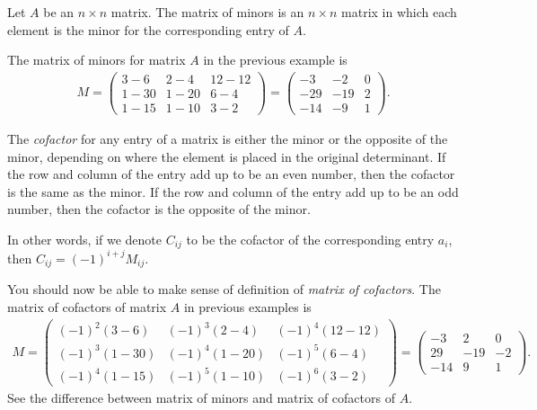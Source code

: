 \documentclass{subfile}
\begin{document}
	\begin{definition}
		Let $A$ be an $n\times n$ matrix. The matrix of minors is an $n\times n$ matrix in which each element is the minor for the corresponding entry of $A$.
	\end{definition}
	
	\begin{example}
		The matrix of minors for matrix $A$ in the previous example is
		\begin{align*}
			M= \begin{pmatrix}
			3-6&2-4&12-12\\1-30&1-20&6-4\\1-15&1-10&3-2
			\end{pmatrix}
			= \begin{pmatrix}
			-3&-2&0\\-29&-19&2\\-14&-9&1
			\end{pmatrix}.
		\end{align*}
	\end{example}
	
	\begin{definition}[Cofactor]
		The \textit{cofactor} for any entry of a matrix is either the minor or the opposite of the minor, depending on where the element is placed in the original determinant. If the row and column of the entry add up to be an even number, then the cofactor is the same as the minor. If the row and column of the entry add up to be an odd number, then the cofactor is the opposite of the minor.
		
		In other words, if we denote $C_{ij}$ to be the cofactor of the corresponding entry $a_{i}$, then $C_{ij}=(-1)^{i+j} M_{ij}$.
	\end{definition}
	
	\begin{example}
		You should now be able to make sense of definition of \textit{matrix of cofactors}. The matrix of cofactors of matrix $A$ in previous examples is
			\begin{align*}
			M= \begin{pmatrix}
			(-1)^{2}(3-6)&(-1)^{3}(2-4)&(-1)^{4}(12-12)\\ (-1)^{3}(1-30)&(-1)^{4}(1-20)&(-1)^{5}(6-4)\\ (-1)^{4}(1-15)&(-1)^{5}(1-10)&(-1)^{6}(3-2)
			\end{pmatrix}
			= \begin{pmatrix}
			-3&2&0\\29&-19&-2\\-14&9&1
			\end{pmatrix}.
			\end{align*}
		See the difference between matrix of minors and matrix of cofactors of $A$. 
	\end{example}
	
\end{document}
